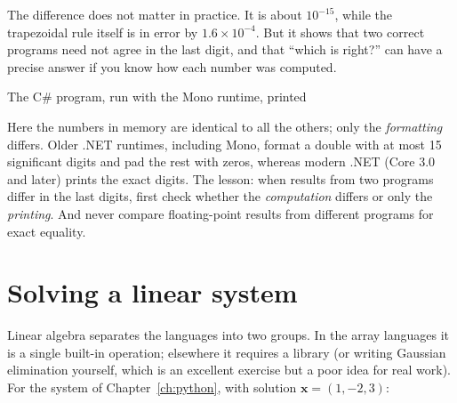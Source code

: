 The difference does not matter in practice. It is about $10^{-15}$, while the
trapezoidal rule itself is in error by $1.6\times10^{-4}$. But it shows that two correct
programs need not agree in the last digit, and that ``which is right?'' can have a precise
answer if you know how each number was computed.

The C\# program, run with the Mono runtime, printed

Here the numbers in memory are identical to all the others; only the \emph{formatting}
differs. Older .NET runtimes, including Mono, format a double with at most 15 significant
digits and pad the rest with zeros, whereas modern .NET (Core 3.0 and later) prints the
exact digits. The lesson: when results from two programs differ in the last digits, first
check whether the \emph{computation} differs or only the \emph{printing}. And never compare
floating-point results from different programs for exact equality.

\section{Solving a linear system}

Linear algebra separates the languages into two groups. In the array languages it is a
single built-in operation; elsewhere it requires a library (or writing Gaussian
elimination yourself, which is an excellent exercise but a poor idea for real work). For
the system of Chapter~\ref{ch:python}, with solution $\mathbf{x} = (1, -2, 3)$:

